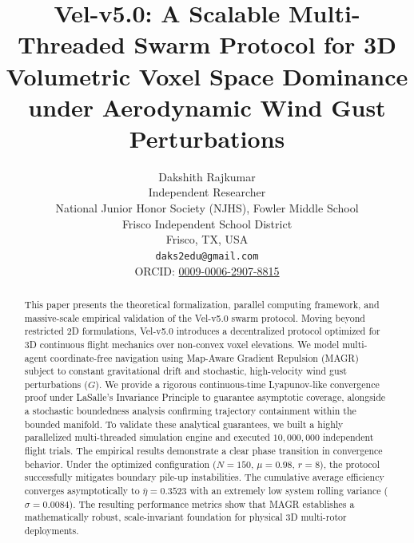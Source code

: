 \documentclass[letterpaper, 10pt, conference]{IEEEtran}
\begin{document}
\title{\LARGE \bf Vel-v5.0: A Scalable Multi-Threaded Swarm Protocol for 3D Volumetric Voxel Space Dominance under Aerodynamic Wind Gust Perturbations}

\author{
    Dakshith Rajkumar \\
    Independent Researcher \\
    National Junior Honor Society (NJHS), Fowler Middle School \\
    Frisco Independent School District \\
    Frisco, TX, USA \\
    \texttt{daks2edu@gmail.com} \\
    ORCID: \href{https://orcid.
org/0009-0006-2907-8815}{0009-0006-2907-8815}
}



\maketitle
\thispagestyle{empty}
\pagestyle{empty}

\begin{abstract}
This paper presents the theoretical formalization, parallel computing framework, and massive-scale empirical validation of the Vel-v5.0 swarm protocol. Moving beyond restricted 2D formulations, Vel-v5.0 introduces a decentralized protocol optimized for 3D continuous flight mechanics over non-convex voxel elevations. We model multi-agent coordinate-free navigation using Map-Aware Gradient Repulsion (MAGR) subject to constant gravitational drift and stochastic, high-velocity wind gust perturbations ($G$). We provide a rigorous continuous-time Lyapunov-like convergence proof under LaSalle's Invariance Principle to guarantee asymptotic coverage, alongside a stochastic boundedness analysis confirming trajectory containment within the bounded manifold. To validate these analytical guarantees, we built a highly parallelized multi-threaded simulation engine and executed $10{,}000{,}000$ independent flight trials. The empirical results demonstrate a clear phase transition in convergence behavior. Under the optimized configuration ($N=150$, $\mu=0.98$, $r=8$), the protocol successfully mitigates boundary pile-up instabilities. The cumulative average efficiency converges asymptotically to $\overline{\eta} = 0.3523$ with an extremely low system rolling variance ($\sigma = 0.0084$). The resulting performance metrics show that MAGR establishes a mathematically robust, scale-invariant foundation for physical 3D multi-rotor deployments.
\end{abstract}
\end{document}
